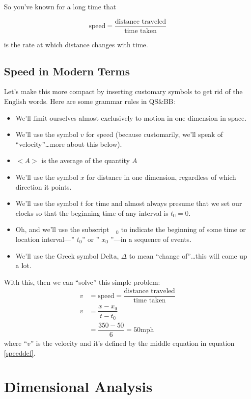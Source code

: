 \documentclass[
  letterpaper,
  DIV=11,
  numbers=noendperiod,
  oneside]{scrreprt}
\begin{document}
So you've known for a long time that

\[
\text{speed} = \dfrac{\text{distance traveled}}{\text{time taken}}
\]

is the rate at which distance changes with time.

\subsection{Speed in Modern Terms}\label{speed-in-modern-terms}

Let's make this more compact by inserting customary symbols to get rid
of the English words. Here are some grammar rules in QS\&BB:

\begin{itemize}
\item
  We'll limit ourselves almost exclusively to motion in one dimension in
  space.
\item
  We'll use the symbol \(v\) for speed (because customarily, we'll speak
  of ``velocity''\ldots more about this below).
\item
  \(<A>\) is the average of the quantity \(A\)
\item
  We'll use the symbol \(x\) for distance in one dimension, regardless
  of which direction it points.
\item
  We'll use the symbol \(t\) for time and almost always presume that we
  set our clocks so that the beginning time of any interval is
  \(t_0=0\).
\item
  Oh, and we'll use the subscript \(\text{ }_{0}\) to indicate the
  beginning of some time or location interval---'' \(t_0\)'' or ''
  \(x_0\) ''---in a sequence of events.
\item
  We'll use the Greek symbol Delta, \(\Delta\) to mean ``change
  of''\ldots this will come up a lot.
\end{itemize}

With this, then we can ``solve'' this simple problem: \[
\begin{align}
v &= \text{speed}=\dfrac{\text{distance traveled}}{\text{time taken}} \nonumber \\
v &=\dfrac{x-x_0}{t-t_0} \label{speeddef} \\
&= \dfrac{350-50}{6}=50  \text{mph} \nonumber
\end{align}
\] where ``\(v\)'' is the velocity and it's defined by the middle
equation in equation \ref{speeddef}.

\section{Dimensional Analysis}\label{dimensional-analysis}
\end{document}
